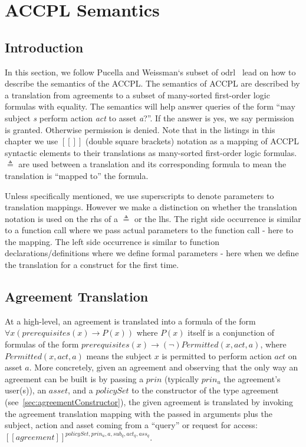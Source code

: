 \chapter{ACCPL Semantics}\label{chap:semantics}

                  
\section{Introduction}\label{sec:introsemantics}


In this section, we follow Pucella and Weissman`s subset of \ac{odrl}~\cite{pucella2006} lead on how to describe the semantics of the \ac{ACCPL}. The semantics of \ac{ACCPL} are described by a translation from agreements to a subset of many-sorted first-order logic formulas with equality. The semantics will help answer queries of the form ``may subject \emph{s} perform action \emph{act} to asset \emph{a}?''. If the answer is yes, we say permission is granted. Otherwise permission is denied. Note that in the listings in this chapter we use $[\![]\!]$ (double square brackets) notation as a mapping of \ac{ACCPL} syntactic elements to their translations as many-sorted first-order logic formulas. $\triangleq$ are used between a translation and its corresponding formula to mean the translation is ``mapped to'' the formula.

Unless specifically mentioned, we use superscripts to denote parameters to translation mappings. However we make a distinction on whether the translation notation is used on the \ac{rhs} of a $\triangleq$ or the \ac{lhs}. The right side occurrence is similar to a function call where we pass actual parameters to the function call - here to the mapping. The left side occurrence is similar to function declarations/definitions where we define formal parameters - here when we define the translation for a construct for the first time. 

\section{Agreement Translation}

At a high-level, an agreement is translated into a formula of the form $\forall x ( prerequisites(x) \rightarrow P(x))$ where $P(x)$ itself is a conjunction of formulas of the form $ prerequisites(x) \rightarrow (\lnot) Permitted (x, act, a)$, where $Permitted (x, act, a)$ means the subject $x$ is permitted to perform action $act$ on asset $a$. More concretely, given an agreement and observing that the only way an agreement can be built is by passing a $prin$ (typically $prin_{u}$ the agreement's user(s)), an $asset$, and a $policySet$ to the constructor of the type agreement (see~\ref{sec:agreementConstructor}), the given agreement is translated by invoking the agreement translation mapping with the passed in arguments plus the subject, action and asset coming from a ``query'' or request for access: $[\![agreement]\!]^{policySet, prin_{u}, a, sub_{q}, act_{q}, ass_{q}}$. 



